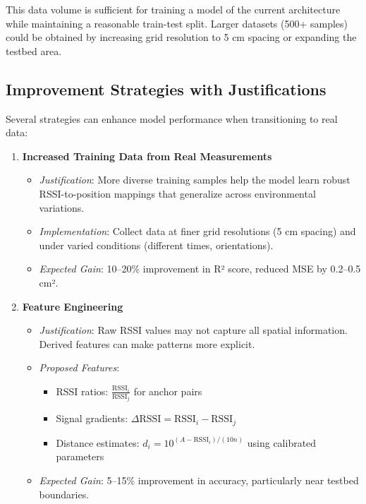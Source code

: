 This data volume is sufficient for training a model of the current architecture while maintaining a reasonable train-test split. Larger datasets (500+ samples) could be obtained by increasing grid resolution to 5 cm spacing or expanding the testbed area.

\subsection{Improvement Strategies with Justifications}

Several strategies can enhance model performance when transitioning to real data:

\begin{enumerate}
    \item \textbf{Increased Training Data from Real Measurements}
    \begin{itemize}
        \item \textit{Justification}: More diverse training samples help the model learn robust RSSI-to-position mappings that generalize across environmental variations.
        \item \textit{Implementation}: Collect data at finer grid resolutions (5 cm spacing) and under varied conditions (different times, orientations).
        \item \textit{Expected Gain}: 10--20\% improvement in R² score, reduced MSE by 0.2--0.5 cm².
    \end{itemize}
    
    \item \textbf{Feature Engineering}
    \begin{itemize}
        \item \textit{Justification}: Raw RSSI values may not capture all spatial information. Derived features can make patterns more explicit.
        \item \textit{Proposed Features}:
        \begin{itemize}
            \item RSSI ratios: $\frac{\text{RSSI}_i}{\text{RSSI}_j}$ for anchor pairs
            \item Signal gradients: $\Delta\text{RSSI} = \text{RSSI}_i - \text{RSSI}_j$
            \item Distance estimates: $d_i = 10^{(A - \text{RSSI}_i)/(10n)}$ using calibrated parameters
        \end{itemize}
        \item \textit{Expected Gain}: 5--15\% improvement in accuracy, particularly near testbed boundaries.
    \end{itemize}
    

\end{enumerate}
